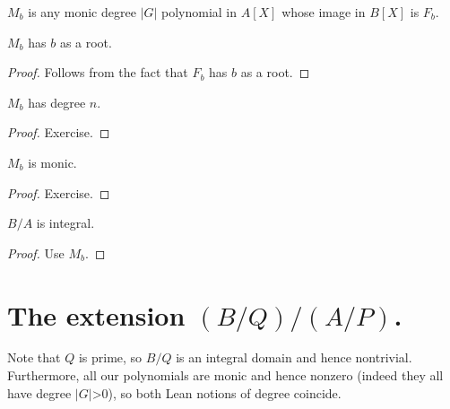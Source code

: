 \begin{definition}
  \label{MulSemiringAction.CharacteristicPolynomial.M}
  \leanok
  $M_b$ is any monic degree $|G|$ polynomial in $A[X]$ whose
  image in $B[X]$ is $F_b$.
\end{definition}

\begin{lemma}
  \label{MulSemiringAction.CharacteristicPolynomial.M_eval_eq_zero}
  \leanok
  $M_b$ has $b$ as a root.
\end{lemma}
\begin{proof}
  \leanok
  Follows from the fact that $F_b$ has $b$ as a root.
\end{proof}
\begin{lemma}
  \label{MulSemiringAction.CharacteristicPolynomial.M_deg}
  \leanok
  $M_b$ has degree $n$.
\end{lemma}
\begin{proof}
  \leanok
  Exercise.
\end{proof}
\begin{lemma}
  \label{MulSemiringAction.CharacteristicPolynomial.M_monic}
  \leanok
  $M_b$ is monic.
\end{lemma}
\begin{proof}
  \leanok
  Exercise.
\end{proof}

\begin{theorem}
  \label{MulSemiringAction.CharacteristicPolynomial.isIntegral}
  \leanok
  $B/A$ is integral.
\end{theorem}
\begin{proof}
  \leanok
  Use $M_b$.
\end{proof}

\section{The extension \texorpdfstring{$(B/Q)/(A/P)$}{(B/Q)/(A/P)}.}

Note that $Q$ is prime, so $B/Q$ is an integral domain and hence nontrivial.
Furthermore, all our polynomials are monic and hence nonzero (indeed they
all have degree $|G|$>0), so both Lean notions of degree coincide.

